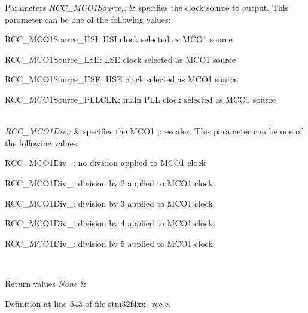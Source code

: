 \begin{DoxyParams}{Parameters}
{\em R\-C\-C\-\_\-\-M\-C\-O1\-Source,\-:} & specifies the clock source to output. This parameter can be one of the following values\-: \begin{DoxyItemize}
\item R\-C\-C\-\_\-\-M\-C\-O1\-Source\-\_\-\-H\-S\-I\-: H\-S\-I clock selected as M\-C\-O1 source \item R\-C\-C\-\_\-\-M\-C\-O1\-Source\-\_\-\-L\-S\-E\-: L\-S\-E clock selected as M\-C\-O1 source \item R\-C\-C\-\_\-\-M\-C\-O1\-Source\-\_\-\-H\-S\-E\-: H\-S\-E clock selected as M\-C\-O1 source \item R\-C\-C\-\_\-\-M\-C\-O1\-Source\-\_\-\-P\-L\-L\-C\-L\-K\-: main P\-L\-L clock selected as M\-C\-O1 source \end{DoxyItemize}
\\
\hline
{\em R\-C\-C\-\_\-\-M\-C\-O1\-Div,\-:} & specifies the M\-C\-O1 prescaler. This parameter can be one of the following values\-: \begin{DoxyItemize}
\item R\-C\-C\-\_\-\-M\-C\-O1\-Div\-\_\-: no division applied to M\-C\-O1 clock \item R\-C\-C\-\_\-\-M\-C\-O1\-Div\-\_\-: division by 2 applied to M\-C\-O1 clock \item R\-C\-C\-\_\-\-M\-C\-O1\-Div\-\_\-: division by 3 applied to M\-C\-O1 clock \item R\-C\-C\-\_\-\-M\-C\-O1\-Div\-\_\-: division by 4 applied to M\-C\-O1 clock \item R\-C\-C\-\_\-\-M\-C\-O1\-Div\-\_\-: division by 5 applied to M\-C\-O1 clock \end{DoxyItemize}
\\
\hline
\end{DoxyParams}

\begin{DoxyRetVals}{Return values}
{\em None} & \\
\hline
\end{DoxyRetVals}


Definition at line 543 of file stm32f4xx\-\_\-rcc.\-c.

